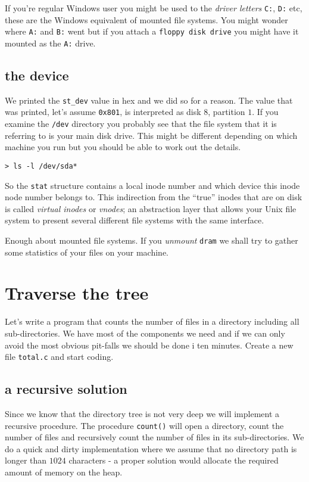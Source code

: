 \documentclass[a4paper,11pt]{article}
\begin{document}
 If you're regular Windows user you might be used to the {\em driver
   letters} {\tt C:}, {\tt D:} etc, these are the Windows equivalent
 of mounted file systems. You might wonder where {\tt A:} and {\tt B:}
 went but if you attach a {\tt floppy disk drive} you might have it
 mounted as the {\tt A:} drive. 

\subsection{the device}

We printed the {\tt st\_dev} value in hex and we did so for a
reason. The value that was printed, let's assume {\tt 0x801}, is
interpreted as disk $8$, partition $1$. If you examine the {\tt /dev}
directory you probably see that the file system that it is referring
to is your main disk drive. This might be different depending on which
machine you run but you should be able to work out the details.

\begin{verbatim}
> ls -l /dev/sda*
\end{verbatim}

So the {\tt stat} structure contains a local inode number and which
device this inode node number belongs to. This indirection from the
``true'' inodes that are on disk is called {\em virtual inodes} or
{\em vnodes}; an abstraction layer that allows your Unix file system
to present several different file systems with the same interface.

Enough about mounted file systems. If you {\em unmount} {\tt dram} we
 shall try to gather some statistics of your files on your machine.

\section{Traverse the tree}

Let's write a program that counts the number of files in a directory
including all sub-directories. We have most of the components we need
and if we can only avoid the most obvious pit-falls we should be done
i ten minutes. Create a new file {\tt total.c} and start coding. 

\subsection{a recursive solution}

Since we know that the directory tree is not very deep we will
implement a recursive procedure. The procedure {\tt count()} will
open a directory, count the number of files and recursively count the
number of files in its sub-directories. We do a quick and dirty
implementation where we assume that no directory path is longer than
$1024$ characters - a proper solution would allocate the required
amount of memory on the heap.
\end{document}
